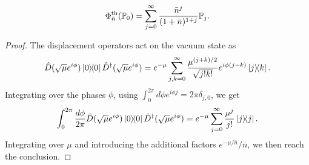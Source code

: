 \documentclass[12pt]{report}
\newcommand{\PP}{\mathbb{P}}
\begin{document}
\begin{prop}\label{prop:thermalisation_applied_to_00}
	\begin{equation}
		\Phi^{\rm th}_{\bar n}(\PP_0)
		= \sum_{j=0}^\infty \frac{\bar n^j}{(1+\bar n)^{1+j}} \PP_j.
	\end{equation}
\end{prop}
\begin{proof}
	The displacement operators act on the vacuum state as
	\begin{equation}
		\hat D(\sqrt\mu e^{i\phi})\ketbra0 \hat D^\dagger(\sqrt\mu e^{i\phi})
		= e^{-\mu} \sum_{j,k=0}^\infty \frac{\mu^{(j+k)/2}}{\sqrt{j!k!}} e^{i\phi(j-k)} \ketbra{j}{k}.
	\end{equation}
	Integrating over the phases $\phi$, using $\int_0^{2\pi}d\phi e^{i\phi j}=2\pi \delta_{j,0}$, we get
	\begin{equation}
		\int_0^{2\pi} \frac{d\phi}{2\pi}
		\hat D(\sqrt\mu e^{i\phi})\ketbra0 \hat D^\dagger(\sqrt\mu e^{i\phi})
		= e^{-\mu} \sum_{j=0}^\infty \frac{\mu^j}{j!} \ketbra j.
	\end{equation}
	Integrating over $\mu$ and introducing the additional factors $e^{-\mu/\bar n}/\bar n$, we then reach the conclusion.
\end{proof}
\end{document}
